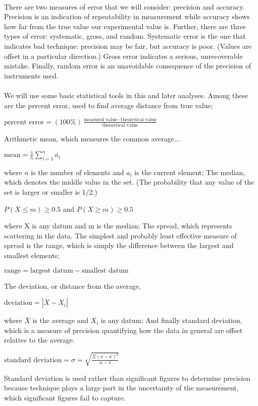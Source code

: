 \documentclass[fleqn,titlepage]{article}
\begin{document}
  \paragraph{} There are two measures of error that we will consider: precision and accuracy. Precision is an indication of repeatability in measurement while accuracy shows how far from the true value our experimental value is. Further, there are three types of error: systematic, gross, and random. Systematic error is the one that indicates bad technique: precision may be fair, but accuracy is poor. (Values are offset in a particular direction.)
  Gross error indicates a serious, unrecoverable mistake. Finally, random error is an unavoidable consequence of the precision of instruments used.
  \paragraph{} We will use some basic statistical tools in this and later analyses. Among these are the percent error, used to find average distance from true value;
  \begin{center}$\text{percent error} = (100\%)
    \frac{\text{measured\ value} - \text{theoretical\ value}}{\text{theoretical\ value}}$\end{center}
  Arithmetic mean, which measures the common average...
  \begin{center}$\text{mean}=\frac{1}{n}\sum\limits_{i=1}^n a_i$\end{center} where $n$ is the number of elements and $a_i$ is the current element;
  The median, which denotes the middle value in the set. (The probability that any value of the set is larger or smaller is 1/2.)
  \begin{center}$P(X \le m) \ge 0.5$ and $P(X \ge m) \ge 0.5$\end{center} where X is any datum and m is the median;
  The spread, which represents scattering in the data. The simplest and probably least effective measure of spread is the range, which is simply the difference between the largest and smallest elements;
  \begin{center}$\text{range} = \text{largest datum} - \text{smallest datum}$\end{center}
  The deviation, or distance from the average,
  \begin{center} $\text{deviation} = |\overline{X} - X_i|$\end{center} where $\overline{X}$ is the average and $X_i$ is any datum;
  And finally standard deviation, which is a measure of precision quantifying how the data in general are offset relative to the average. 
 \begin{center}$\text{standard deviation} = \sigma = 
  \sqrt{\frac{\Sigma (x-\bar{x})^2}{n-1}}$\end{center}
  Standard deviation is used rather than significant figures to determine precision because technique plays a large part in the uncertainty of the measurement, which significant figures fail to capture.
\end{document}
